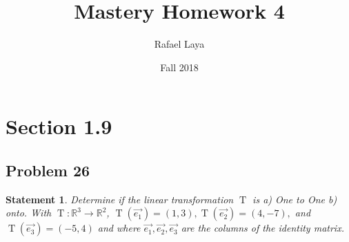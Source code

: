 \documentclass[12pt, letterpaper]{article}
\title{Mastery Homework 4}
\author{Rafael Laya}
\date{Fall 2018}
\newcommand{\R}{\mathbb{R}}
\theoremstyle{statement}
\theoremstyle{statement}
\newtheorem*{atmStat}{Statement}
\begin{document}
    \maketitle
    
    \section*{Section 1.9}
    \subsection*{Problem 26}
    \begin{atmStat}
    Determine if the linear transformation $\operatorname{T}$ is a) One to One b) onto. With
    $\operatorname{T}:\R^3\longrightarrow\R^2$, $\operatorname{T}(\Vec{e_1})=(1, 3), \operatorname{T}(\Vec{e_2})=(4,-7),$ and $\operatorname{T}(\Vec{e_3})=(-5, 4)$ and where $\Vec{e_1}, \Vec{e_2}, \Vec{e_3}$ are the columns of the identity matrix.
    \end{atmStat}
\end{document}
